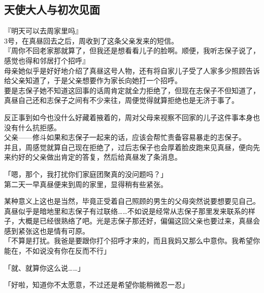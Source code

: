 \subsection{天使大人与初次见面}

『明天可以去周家里吗』\\

3号，在真昼回去之后，周收到了这条父亲发来的短信。\\

『周你不回老家那就算了，但我还是想看看儿子的脸啊。顺便，我听志保子说了，感觉也得和邻居打个招呼』\\

母亲她似乎是好好地介绍了真昼这号人物，还有将自家儿子受了人家多少照顾告诉给父亲知道了，于是父亲想要作为家长向她打一个招呼。\\

要是志保子她不知道这回事的话周肯定就全力拒绝了，但现在志保子不但知道了，真昼自己还和志保子之间有不少来往，周便觉得就算拒绝也是无济于事了。

反正事到如今也没什么好藏着掖着的，周对父母来视察不回家的儿子这件事本身也没有什么抗拒感。\\

父亲——修斗如果和志保子一起来的话，应该会帮忙责备容易暴走的志保子。\\

并且，周感觉就算自己现在拒绝了，过后志保子也会厚着脸皮跑来见真昼，便向先来约好的父亲做出肯定的答复，然后给真昼发了条消息。\\

\vspace{2\baselineskip}

「嗯，那个，我打扰你们家庭团聚真的没问题吗？」\\

第二天一早真昼便来到周的家里，显得稍有些紧张。

某种意义上这也是当然，毕竟正受着自己照顾的男生的父母突然说要想要见自己。\\

真昼似乎是暗地里和志保子有过联络……不如说是经常从志保子那里发来联系的样子，大概是已经很熟络了吧。光是志保子那还好，偏偏这回父亲也要过来，真昼会感到紧张这也是情有可原。\\

「不算是打扰。我爸是要跟你打个招呼才来的，而且我妈又那么中意你。我希望你能在，不如说没有你在反而不行」

「就、就算你这么说……」

「好啦，知道你不太愿意，不过还是希望你能稍微忍一忍」\\

